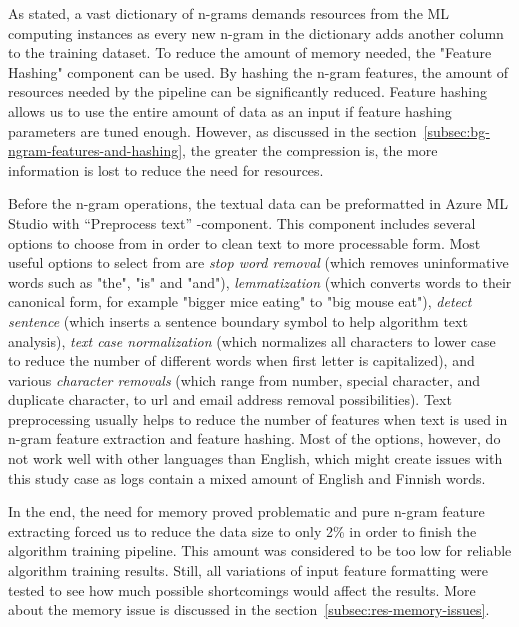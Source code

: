 As stated,
a vast dictionary of n-grams demands resources from the ML computing instances
as every new n-gram in the dictionary adds another column to the training dataset.
To reduce the amount of memory needed,
the "Feature Hashing" component can be used.
By hashing the n-gram features,
the amount of resources needed by the pipeline
can be significantly reduced.
Feature hashing allows us to use the entire amount of data as an input
if feature hashing parameters are tuned enough.
However,
as discussed in the section~\ref{subsec:bg-ngram-features-and-hashing},
the greater the compression is,
the more information is lost
to reduce the need for resources.

Before the n-gram operations,
the textual data can be preformatted in Azure ML Studio
with \enquote{Preprocess text} -component.
This component includes several options to choose from
in order to clean text to more processable form.
Most useful options to select from are
\textit{stop word removal} (which removes uninformative words such as "the", "is" and "and"),
\textit{lemmatization} (which converts words to their canonical form,
for example "bigger mice eating" to "big mouse eat"),
\textit{detect sentence} (which inserts a sentence boundary symbol
to help algorithm text analysis),
\textit{text case normalization} (which normalizes all characters to lower case
to reduce the number of different words when first letter is capitalized),
and various \textit{character removals} (which range from number, special character, and duplicate character,
to url and email address removal possibilities).
Text preprocessing usually helps to reduce the number of features
when text is used in n-gram feature extraction and feature hashing.
Most of the options, however,
do not work well with other languages than English,
which might create issues with this study case
as logs contain a mixed amount of English and Finnish words.~\cite{azure2021preprocess}

In the end,
the need for memory proved problematic
and pure n-gram feature extracting forced us
to reduce the data size to only 2\%
in order to finish the algorithm training pipeline.
This amount was considered to be too low
for reliable algorithm training results.
Still,
all variations of input feature formatting were tested
to see how much possible shortcomings would affect the results.
More about the memory issue is discussed
in the section~\ref{subsec:res-memory-issues}.




